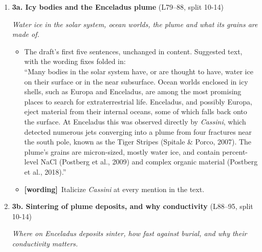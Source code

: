 \documentclass[11pt]{article}
\newcommand{\Pg}[3]{\item \textbf{#1} {\small(#2)}\par\textit{#3}}
\newcommand{\tC}{\textcolor{miss}{\textbf{[correct]}}\ }
\newcommand{\tG}{\textcolor{stale}{\textbf{[wording]}}\ }
\newcommand{\add}[1]{\textcolor{revA}{#1}}
\begin{document}
\begin{enumerate}
\begin{itemize}
    within them (Calonne et al., 2011, 2019), and it is an input of the
    detailed snowpack models used to follow their evolution (Lehning et al.,
    2002; Vionnet et al., 2012).'' All four are in the \texttt{.bib}; check
    each claim against the paper.
  \item \add{Done in the draft (D-L257, Calonne 2011, 2019): supported. Use \texttt{\textbackslash citep}, not \texttt{\textbackslash citet}.}
  \item \add{\tC Colbeck (1998) is still cited for depth hoar and avalanches; it treats grain-boundary sintering. Keep Fukuzawa \& Akitaya and Schweizer et al.}
  \end{itemize}
\Pg{3a. Icy bodies and the Enceladus plume}{L79--88, split 10-14}{Water ice in the solar system, ocean worlds, the plume and what its grains are made of.}
  \begin{itemize}
  \item The draft's first five sentences, unchanged in content. Suggested
    text, with the wording fixes folded in:\\
    ``Many bodies in the solar system have, or are thought to have, water
    ice on their surface or in the near subsurface. Ocean worlds enclosed in
    icy shells, such as Europa and Enceladus, are among the most promising
    places to search for extraterrestrial life. Enceladus, and possibly
    Europa, eject material from their internal oceans, some of which falls
    back onto the surface. At Enceladus this was observed directly by
    \textit{Cassini}, which detected numerous jets converging into a plume
    from four fractures near the south pole, known as the Tiger Stripes
    (Spitale \& Porco, 2007). The plume's grains are micron-sized, mostly
    water ice, and contain percent-level NaCl (Postberg et al., 2009) and
    complex organic material (Postberg et al., 2018).''
  \item \tG Italicize \textit{Cassini} at every mention in the text.
  \end{itemize}
\Pg{3b. Sintering of plume deposits, and why conductivity}{L88--95, split 10-14}{Where on Enceladus deposits sinter, how fast against burial, and why their conductivity matters.}
  \begin{itemize}

\end{itemize}
\end{enumerate}
\end{document}

